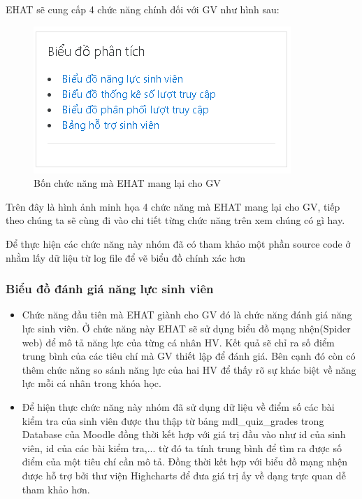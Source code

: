 EHAT sẽ cung cấp 4 chức năng chính đối với GV như hình sau:

\begin{center}
	\begin{figure}[htp]
		\begin{center}
			\includegraphics[scale=1]{img/gvtool}
		\end{center}
		\caption{Bốn chức năng mà EHAT mang lại cho GV}
		\label{refhinh27}
	\end{figure}
\end{center}

\vskip 5cm
Trên đây là hình ảnh minh họa 4 chức năng mà EHAT mang lại cho GV, tiếp theo chúng ta sẽ cùng đi vào chi tiết từng chức năng trên xem chúng có gì hay.

Để thực hiện các chức năng này nhóm đã có tham khảo một phần source code ở \cite{code} nhằm lấy dữ liệu từ log file để vẽ biểu đồ chính xác hơn

\subsubsection{Biểu đồ đánh giá năng lực sinh viên}
\begin{itemize}
	\item Chức năng đầu tiên mà EHAT giành cho GV đó là chức năng đánh giá năng lực sinh viên. Ở chức năng này EHAT sẽ sử dụng biểu đồ mạng nhện(Spider web) để mô tả năng lực của từng cá nhân HV. Kết quả sẽ chỉ ra số điểm trung bình của các tiêu chí mà GV thiết lập để đánh giá. Bên cạnh đó còn có thêm chức năng so sánh năng lực của hai HV để thấy rõ sự khác biệt về năng lực mỗi cá nhân trong khóa học.
	
	\item Để hiện thực chức năng này nhóm đã sử dụng dữ liệu về điểm số các bài kiểm tra của sinh viên được thu thập từ bảng mdl\_quiz\_grades trong Database của Moodle đồng thời kết hợp với giá trị đầu vào như id của sinh viên, id của các bài kiểm tra,... từ đó ta tính trung bình để tìm ra được số điểm của một tiêu chí cần mô tả. Đồng thời kết hợp với biểu đồ mạng nhện được hỗ trợ bởi thư viện Highcharts để đưa giá trị ấy về dạng trực quan dễ tham khảo hơn.
\end{itemize}

